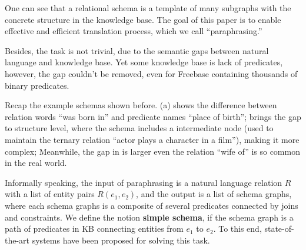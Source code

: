 %
%
One can see that a relational schema is a template of many subgraphs 
with the concrete structure in the knowledge base.
The goal of this paper is to enable effective and efficient translation 
process, which we call ``paraphrasing.'' 



Besides, the task is not trivial, due to the semantic gaps between natural language
and knowledge base. Yet some knowledge base is lack of predicates, however, the gap
couldn't be removed, even for Freebase containing thousands of binary predicates.

Recap the example schemas shown before. 
 (a) shows the difference between relation words ``was born in''
and predicate names ``place of birth'';  brings the gap to 
structure level, where the schema includes a intermediate node (used to maintain the
ternary relation ``actor plays a character in a film''), making it more complex;
Meanwhile, the gap in  is larger even the relation ``wife of''
is so common in the real world. 

Informally speaking, the input of paraphrasing is a natural language relation $R$ with a
list of entity pairs $R(e_1, e_2)$, and the output is a list of schema graphs, where each
schema graphs is a composite of several predicates connected by joins and constraints.
We define the notion \textbf{simple schema}, if the schema graph is a path of predicates
in KB connecting entities from $e_1$ to $e_2$. 
To this end, state-of-the-art systems have been proposed for solving this task.

